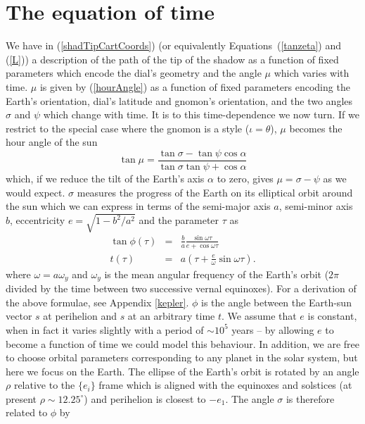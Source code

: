 \documentclass[12pt]{article}
\newcommand{\nn}{\nonumber}
\newcommand{\om}{\omega}
\newcommand{\omy}{\omega_y}
\begin{document}
\section{The equation of time} \label{eot}
%
We have in (\ref{shadTipCartCoords}) (or equivalently Equations~(\ref{tanzeta}) and (\ref{L})) a description of the path of the tip of the shadow as a function of fixed parameters which encode the dial's geometry and the angle $\mu$ which varies with time. $\mu$ is given by (\ref{hourAngle}) as a function of fixed parameters encoding the Earth's orientation, dial's latitude and gnomon's orientation, and the two angles $\sigma$ and $\psi$ which change with time. It is to this time-dependence we now turn. If we restrict to the special case where the gnomon is a style ($\iota = \theta$), $\mu$ becomes the hour angle of the sun
%
\begin{equation} \label{trueHourAngle}
\tan\mu = \frac{\tan\sigma - \tan\psi\cos\alpha}{\tan\sigma\tan\psi + \cos\alpha}
\end{equation}
%
which, if we reduce the tilt of the Earth's axis $\alpha$ to zero, gives $\mu = \sigma - \psi$ as we would expect. $\sigma$ measures the progress of the Earth on its elliptical orbit around the sun which we can express in terms of the semi-major axis $a$, semi-minor axis $b$, eccentricity $e = \sqrt{1 - b^2/a^2}$ and the parameter $\tau$ as
%
\begin{eqnarray} \label{keplerCoords}
\tan\phi(\tau) & = & \frac{b}{a} \frac{\sin \om \tau}{e + \cos \om \tau} \\ \nn
t(\tau) & = & a\left(\tau + \frac{e}{\omega}\sin \om \tau\right).
\end{eqnarray}
%
where $\omega = a\omy$ and $\omy$ is the mean angular frequency of the Earth's orbit ($2\pi$ divided by the time between two successive vernal equinoxes). For a derivation of the above formulae, see Appendix \ref{kepler}. $\phi$ is the angle between the Earth-sun vector $s$ at perihelion and $s$ at an arbitrary time $t$. We assume that $e$ is constant, when in fact it varies slightly with a period of $\sim 10^5$ years -- by allowing $e$ to become a function of time we could model this behaviour. In addition, we are free to choose orbital parameters corresponding to any planet in the solar system, but here we focus on the Earth. The ellipse of the Earth's orbit is rotated by an angle $\rho$ relative to the $\{e_i\}$ frame which is aligned with the equinoxes and solstices (at present $\rho \sim 12.25^\circ$) and perihelion is closest to $-e_1$. The angle $\sigma$ is therefore related to $\phi$ by
\end{document}
